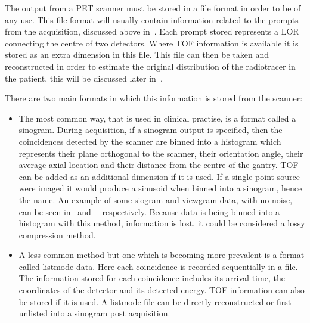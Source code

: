                The output from a \gls{PET} scanner must be stored in a %
                file format in order to be of any use. %
                This file format will usually contain information related to the prompts from the acquisition, discussed above in~. Each prompt stored represents a \gls{LOR} connecting the centre of two detectors. %
                Where \gls{TOF} information is available it is stored as an extra dimension in this file. This file can then be taken and reconstructed in order to estimate the original distribution of the radiotracer in the patient, this will be discussed later in~.
                
                There are two main formats in which this information is stored from the scanner:
                
                \begin{itemize}
                    \item The most common way, that is used in clinical practise, is a format called a sinogram. During acquisition, if a sinogram output is specified, then the coincidences detected by the scanner are binned into a histogram which represents their plane orthogonal to the scanner, their orientation angle, their average axial location and their distance from the centre of the gantry. \gls{TOF} can be added as an additional dimension if it is used. %
                    If a single point source were imaged it would produce a sinusoid when binned into a sinogram, hence the name. An example of some siogram and viewgram data, with no noise, can be seen in~ and~~ respectively. Because data is being binned into a histogram with this method,  information is lost, it could be considered a lossy compression method.
                    
                    \item A less common method but one which is becoming more prevalent is a format called listmode data. Here each coincidence is recorded sequentially in a file. The information stored for each coincidence includes its arrival time, the coordinates of the detector and its detected energy. \gls{TOF} information can also be stored if it is used. %
                    A listmode file can be directly reconstructed or first unlisted into a sinogram post acquisition. %
                \end{itemize}
            
